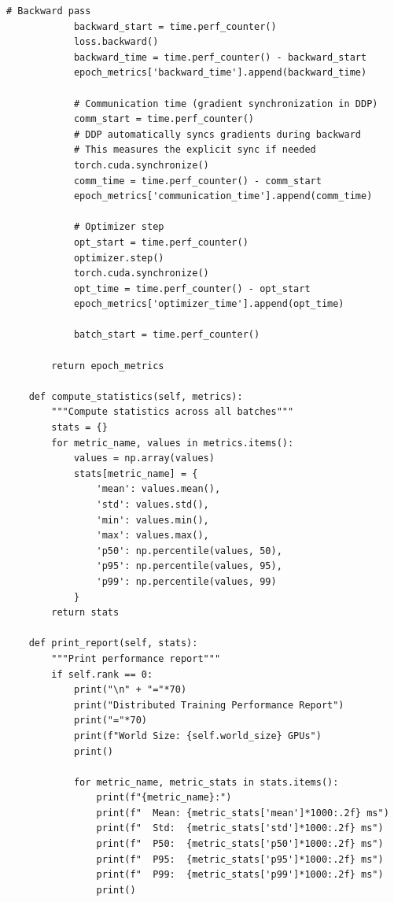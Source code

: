 \begin{lstlisting}[style=python, caption=Comprehensive performance benchmarking]
            # Backward pass
            backward_start = time.perf_counter()
            loss.backward()
            backward_time = time.perf_counter() - backward_start
            epoch_metrics['backward_time'].append(backward_time)

            # Communication time (gradient synchronization in DDP)
            comm_start = time.perf_counter()
            # DDP automatically syncs gradients during backward
            # This measures the explicit sync if needed
            torch.cuda.synchronize()
            comm_time = time.perf_counter() - comm_start
            epoch_metrics['communication_time'].append(comm_time)

            # Optimizer step
            opt_start = time.perf_counter()
            optimizer.step()
            torch.cuda.synchronize()
            opt_time = time.perf_counter() - opt_start
            epoch_metrics['optimizer_time'].append(opt_time)

            batch_start = time.perf_counter()

        return epoch_metrics

    def compute_statistics(self, metrics):
        """Compute statistics across all batches"""
        stats = {}
        for metric_name, values in metrics.items():
            values = np.array(values)
            stats[metric_name] = {
                'mean': values.mean(),
                'std': values.std(),
                'min': values.min(),
                'max': values.max(),
                'p50': np.percentile(values, 50),
                'p95': np.percentile(values, 95),
                'p99': np.percentile(values, 99)
            }
        return stats

    def print_report(self, stats):
        """Print performance report"""
        if self.rank == 0:
            print("\n" + "="*70)
            print("Distributed Training Performance Report")
            print("="*70)
            print(f"World Size: {self.world_size} GPUs")
            print()

            for metric_name, metric_stats in stats.items():
                print(f"{metric_name}:")
                print(f"  Mean: {metric_stats['mean']*1000:.2f} ms")
                print(f"  Std:  {metric_stats['std']*1000:.2f} ms")
                print(f"  P50:  {metric_stats['p50']*1000:.2f} ms")
                print(f"  P95:  {metric_stats['p95']*1000:.2f} ms")
                print(f"  P99:  {metric_stats['p99']*1000:.2f} ms")
                print()


\end{lstlisting}
